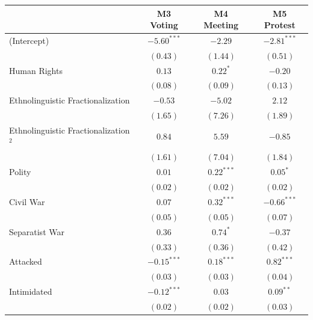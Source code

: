 \documentclass[12pt,]{book}
\let\origtable\table
\let\endorigtable\endtable
\renewenvironment{table}[1][2] {
    \singlespacing
    \expandafter\origtable\expandafter[H]
} {
    \endorigtable
}
\theoremstyle{definition}
\theoremstyle{definition}
\theoremstyle{definition}
\theoremstyle{remark}
\begin{document}
\begin{table}
\begin{center}
\begin{tabular}{l c c c }
\hline
 & M3 Voting & M4 Meeting & M5 Protest \\
\hline
(Intercept)                             & $-5.60^{***}$ & $-2.29$       & $-2.81^{***}$ \\
                                        & $(0.43)$      & $(1.44)$      & $(0.51)$      \\
Human Rights                            & $0.13$        & $0.22^{*}$    & $-0.20$       \\
                                        & $(0.08)$      & $(0.09)$      & $(0.13)$      \\
Ethnolinguistic Fractionalization       & $-0.53$       & $-5.02$       & $2.12$        \\
                                        & $(1.65)$      & $(7.26)$      & $(1.89)$      \\
Ethnolinguistic Fractionalization$^{2}$ & $0.84$        & $5.59$        & $-0.85$       \\
                                        & $(1.61)$      & $(7.04)$      & $(1.84)$      \\
Polity                                  & $0.01$        & $0.22^{***}$  & $0.05^{*}$    \\
                                        & $(0.02)$      & $(0.02)$      & $(0.02)$      \\
Civil War                               & $0.07$        & $0.32^{***}$  & $-0.66^{***}$ \\
                                        & $(0.05)$      & $(0.05)$      & $(0.07)$      \\
Separatist War                          & $0.36$        & $0.74^{*}$    & $-0.37$       \\
                                        & $(0.33)$      & $(0.36)$      & $(0.42)$      \\
Attacked                                & $-0.15^{***}$ & $0.18^{***}$  & $0.82^{***}$  \\
                                        & $(0.03)$      & $(0.03)$      & $(0.04)$      \\
Intimidated                             & $-0.12^{***}$ & $0.03$        & $0.09^{**}$   \\
                                        & $(0.02)$      & $(0.02)$      & $(0.03)$      \\

\end{tabular}
\end{center}
\end{table}
\end{document}

